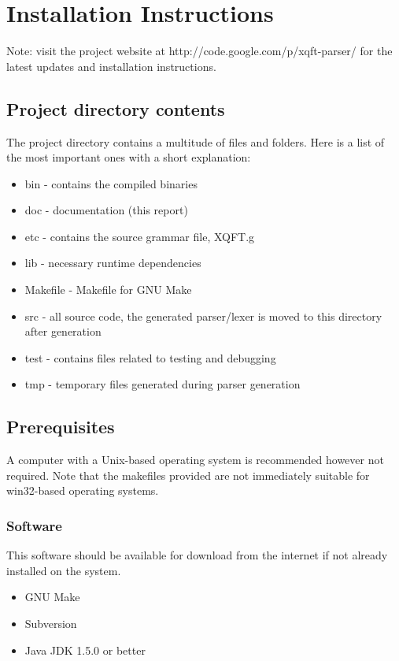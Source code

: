 \chapter{Installation Instructions}
Note: visit the project website at http://code.google.com/p/xqft-parser/
for the latest updates and installation instructions.

\section*{Project directory contents}
The project directory contains a multitude of files and folders. Here is a list
of the most important ones with a short explanation:
\begin{itemize}
  \item bin - contains the compiled binaries
  \item doc - documentation (this report)
  \item etc - contains the source grammar file, XQFT.g
  \item lib - necessary runtime dependencies
  \item Makefile - Makefile for GNU Make
  \item src - all source code, the generated parser/lexer is moved to this
  directory after generation
  \item test - contains files related to testing and debugging
  \item tmp - temporary files generated during parser generation
\end{itemize}

\section*{Prerequisites}
A computer with a Unix-based operating system is recommended however not
required. Note that the makefiles provided are not immediately suitable for
win32-based operating systems.

\subsection*{Software}
This software should be available for download from the internet if not already
installed on the system.

\begin{itemize}
  \item GNU Make
  \item Subversion
  \item Java JDK 1.5.0 or better
\end{itemize}

